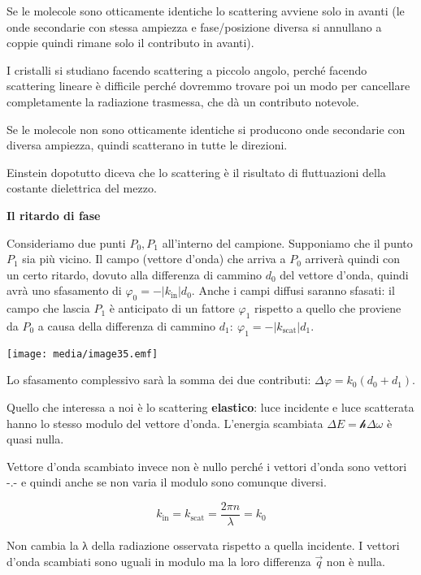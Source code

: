 Se le molecole sono otticamente identiche lo scattering avviene solo in
avanti (le onde secondarie con stessa ampiezza e fase/posizione diversa
si annullano a coppie quindi rimane solo il contributo in avanti).

I cristalli si studiano facendo scattering a piccolo angolo, perché
facendo scattering lineare è difficile perché dovremmo trovare poi un
modo per cancellare completamente la radiazione trasmessa, che dà un
contributo notevole.

Se le molecole non sono otticamente identiche si producono onde
secondarie con diversa ampiezza, quindi scatterano in tutte le
direzioni.

Einstein dopotutto diceva che lo scattering è il risultato di
fluttuazioni della costante dielettrica del mezzo.

\textbf{Il ritardo di fase}

Consideriamo due punti \(P_{0},P_{1}\) all'interno del campione.
Supponiamo che il punto \(P_{1}\) sia più vicino. Il campo (vettore
d'onda) che arriva a \(P_{0}\) arriverà quindi con un certo ritardo,
dovuto alla differenza di cammino \(d_{0}\) del vettore d'onda, quindi
avrà uno sfasamento di
\(\varphi_{0} = - \left| k_{\text{in}} \right|d_{0}\). Anche i campi
diffusi saranno sfasati: il campo che lascia \(P_{1}\) è anticipato di
un fattore \(\varphi_{1}\) rispetto a quello che proviene da \(P_{0}\) a
causa della differenza di cammino
\(d_{1}:\ \varphi_{1} = - \left| k_{\text{scat}} \right|d_{1}\).

\texttt{[image: media/image35.emf]}

Lo sfasamento complessivo sarà la somma dei due contributi:
\(\Delta\varphi = k_{0}\left( d_{0} + d_{1} \right)\).

Quello che interessa a noi è lo scattering \textbf{elastico}: luce
incidente e luce scatterata hanno lo stesso modulo del vettore d'onda.
L'energia scambiata \(\Delta E = \mathcal{h}\Delta\omega\) è quasi
nulla.

Vettore d'onda scambiato invece non è nullo perché i vettori d'onda sono
vettori -.- e quindi anche se non varia il modulo sono comunque diversi.

\[k_{\text{in}} = k_{\text{scat}} = \frac{2\pi n}{\lambda} = k_{0}\]

Non cambia la λ della radiazione osservata rispetto a quella incidente.
I vettori d'onda scambiati sono uguali in modulo ma la loro differenza
\(\overrightarrow{q}\) non è nulla.

